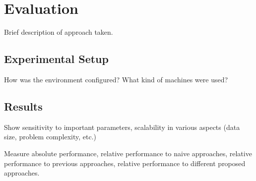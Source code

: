 \section{Evaluation}
\label{sec:eval}
Brief description of approach taken.

\subsection{Experimental Setup}
How was the environment configured?
What kind of machines were used?

\subsection{Results}
Show sensitivity to important parameters,
scalability in various aspects (data size,
problem complexity, etc.)


Measure absolute performance,
relative performance to naive approaches,
relative performance to previous approaches,
relative performance to different proposed approaches.




